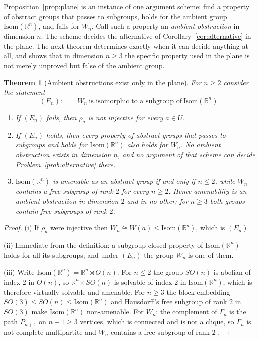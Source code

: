 \documentclass[11pt,a4paper]{article}
\newcommand{\R}{\mathbb{R}}
\newcommand{\Isom}{\mathrm{Isom}}
\newtheorem{theorem}{Theorem}
\theoremstyle{definition}
\theoremstyle{remark}
\theoremstyle{plain}
\begin{document}
Proposition~\ref{prop:plane} is an instance of one argument scheme: find a property of abstract
groups that passes to subgroups, holds for the ambient group $\Isom(\R^n)$, and fails for
$W_n$. Call such a property an \emph{ambient obstruction} in dimension $n$. The scheme decides
the alternative of Corollary~\ref{cor:alternative} in the plane. The next theorem determines
exactly when it can decide anything at all, and shows that in dimension $n\ge3$ the specific
property used in the plane is not merely unproved but false of the ambient group.

\begin{theorem}[Ambient obstructions exist only in the plane]\label{thm:barrier}
For $n\ge2$ consider the statement
\[
(E_n):\qquad W_n\ \text{is isomorphic to a subgroup of}\ \Isom(\R^n).
\]
\begin{enumerate}[label=(\roman*),leftmargin=2.2em]
\item If $(E_n)$ fails, then $\rho_a$ is not injective for every $a\in U$.
\item If $(E_n)$ holds, then every property of abstract groups that passes to subgroups and
holds for $\Isom(\R^n)$ also holds for $W_n$. No ambient obstruction exists in dimension $n$,
and no argument of that scheme can decide Problem~\ref{prob:alternative} there.
\item $\Isom(\R^n)$ is amenable as an abstract group if and only if $n\le2$, while $W_n$
contains a free subgroup of rank $2$ for every $n\ge2$. Hence amenability is an ambient
obstruction in dimension $2$ and in no other; for $n\ge3$ both groups contain free subgroups of
rank $2$.
\end{enumerate}
\end{theorem}

\begin{proof}
(i) If $\rho_a$ were injective then $W_n\cong W(a)\le\Isom(\R^n)$, which is $(E_n)$.

(ii) Immediate from the definition: a subgroup-closed property of $\Isom(\R^n)$ holds for all
its subgroups, and under $(E_n)$ the group $W_n$ is one of them.

(iii) Write $\Isom(\R^n)=\R^n\rtimes O(n)$. For $n\le2$ the group $SO(n)$ is abelian of index
$2$ in $O(n)$, so $\R^n\rtimes SO(n)$ is solvable of index $2$ in $\Isom(\R^n)$, which is
therefore virtually solvable and amenable. For $n\ge3$ the block embedding
$SO(3)\le SO(n)\le\Isom(\R^n)$ and Hausdorff's free subgroup of rank $2$ in $SO(3)$
\cite[Thm.~2.1]{Wagon} make $\Isom(\R^n)$ non-amenable. For $W_n$: the complement of
$\Gamma_n$ is the path $P_{n+1}$ on $n+1\ge3$ vertices, which is connected and is not a clique,
so $\Gamma_n$ is not complete multipartite and $W_n$ contains a free subgroup of rank $2$
\cite{Davis}.
\end{proof}
\end{document}
